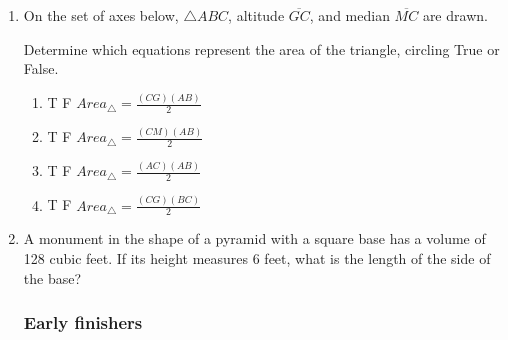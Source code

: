 \documentclass[12pt, twoside]{article}
\begin{document}
\begin{enumerate}
\newpage

  \item On the set of axes below, $\triangle ABC$, altitude $\overline{GC}$, and  median $\overline{MC}$ are drawn.
    \begin{center}
    \end{center}
      Determine which equations represent the area of the triangle, circling True or False.
      \begin{multicols}{2}
       \begin{enumerate}
          \item \quad T \quad F \quad $\displaystyle Area_\triangle = \frac{(CG)(AB)}{2}$
          \item \quad T \quad F \quad $\displaystyle Area_\triangle = \frac{(CM)(AB)}{2}$ \vspace{0.25cm}
          \item \quad T \quad F \quad $\displaystyle Area_\triangle = \frac{(AC)(AB)}{2}$ \vspace{0.25cm}
          \item \quad T \quad F \quad $\displaystyle Area_\triangle = \frac{(CG)(BC)}{2}$
      \end{enumerate}
      \end{multicols}
      \vspace{0.25cm}

  \item A monument in the shape of a pyramid with a square base has a volume of 128 cubic feet. If its height measures 6 feet, what is the length of the side of the base? \vspace{3.5cm}

\newpage
\subsubsection*{Early finishers}



\end{enumerate}
\end{document}
